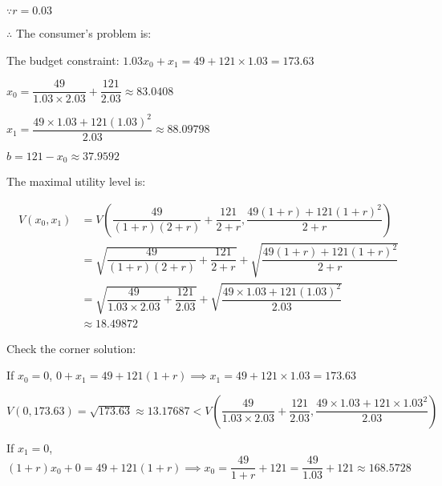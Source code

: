 \documentclass{article}
\begin{document}
$\because r=0.03$

$\therefore$ The consumer's problem is:


The budget constraint: $1.03x_{0}+x_{1}=49+121\times1.03=173.63$

$x_{0}=\dfrac{49}{1.03\times2.03}+\dfrac{121}{2.03}\approx\boxed{83.0408}$

$x_{1}=\dfrac{49\times1.03+121\left(1.03\right)^{2}}{2.03}\approx\boxed{88.09798}$

$b=121-x_{0}\approx\boxed{37.9592}$

The maximal utility level is:

\begin{equation*}
    \begin{split}
        V\left(x_{0},x_{1}\right) & = V\left(\dfrac{49}{\left(1+r\right)\left(2+r\right)}+\dfrac{121}{2+r}, \dfrac{49\left(1+r\right)+121\left(1+r\right)^{2}}{2+r}\right) \\
        & = \sqrt{\dfrac{49}{\left(1+r\right)\left(2+r\right)}+\dfrac{121}{2+r}}+\sqrt{\dfrac{49\left(1+r\right)+121\left(1+r\right)^{2}}{2+r}} \\
        & = \sqrt{\dfrac{49}{1.03\times2.03}+\dfrac{121}{2.03}}+\sqrt{\dfrac{49\times1.03+121\left(1.03\right)^{2}}{2.03}} \\
        & \approx \boxed{18.49872}
    \end{split}
\end{equation*}

Check the corner solution:

If $x_{0}=0$, $0+x_{1}=49+121\left(1+r\right)\implies x_{1}=49+121\times1.03=173.63$

$V\left(0, 173.63\right)=\sqrt{173.63}\approx13.17687<V\left(\dfrac{49}{1.03\times2.03}+\dfrac{121}{2.03}, \dfrac{49\times1.03+121\times1.03^{2}}{2.03}\right)$

If $x_{1}=0$, $\left(1+r\right)x_{0}+0=49+121\left(1+r\right)\implies x_{0}=\dfrac{49}{1+r}+121=\dfrac{49}{1.03}+121\approx168.5728$
\end{document}
